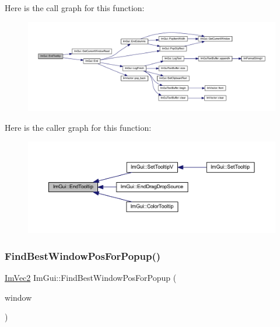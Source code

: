 Here is the call graph for this function\+:
\nopagebreak
\begin{figure}[H]
\begin{center}
\leavevmode
\includegraphics[width=350pt]{namespace_im_gui_ac8d75c160cfdf43d512f773ca133a1c6_cgraph}
\end{center}
\end{figure}
Here is the caller graph for this function\+:
\nopagebreak
\begin{figure}[H]
\begin{center}
\leavevmode
\includegraphics[width=350pt]{namespace_im_gui_ac8d75c160cfdf43d512f773ca133a1c6_icgraph}
\end{center}
\end{figure}
\mbox{\label{namespace_im_gui_a310ff87cbe678e2c632bf1f5577a7fbd}} 
\subsubsection{\texorpdfstring{Find\+Best\+Window\+Pos\+For\+Popup()}{FindBestWindowPosForPopup()}}
{\footnotesize\ttfamily \mbox{\hyperlink{struct_im_vec2}{Im\+Vec2}} Im\+Gui\+::\+Find\+Best\+Window\+Pos\+For\+Popup (\begin{DoxyParamCaption}\item[{\mbox{\hyperlink{struct_im_gui_window}{Im\+Gui\+Window}} $\ast$}]{window }\end{DoxyParamCaption})}

